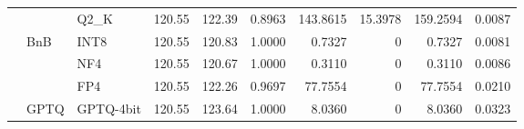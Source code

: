 \begin{longtable}{ll l rrrrrrr}
 &  & Q2\_K & 120.55 & 122.39 & \cellcolor{red!18} 0.8963 & \cellcolor{red!18} 143.8615 & 15.3978 & \cellcolor{red!18} 159.2594 & \cellcolor{red!18} 0.0087 \\
 & BnB & INT8 & 120.55 & 120.83 & 1.0000 & 0.7327 & \cellcolor{cyan!12} $0$ & 0.7327 & 0.0081 \\
 &  & NF4 & 120.55 & 120.67 & 1.0000 & 0.3110 & \cellcolor{cyan!12} $0$ & 0.3110 & 0.0086 \\
 &  & FP4 & 120.55 & 122.26 & 0.9697 & 77.7554 & \cellcolor{cyan!12} $0$ & 77.7554 & 0.0210 \\
 & GPTQ & GPTQ-4bit & 120.55 & 123.64 & 1.0000 & 8.0360 & \cellcolor{cyan!12} $0$ & 8.0360 & 0.0323 \\
\end{longtable}
\endgroup
